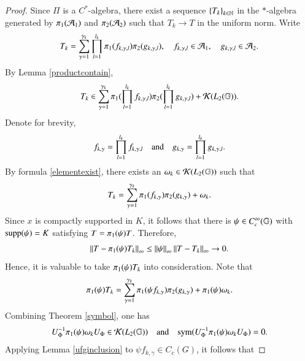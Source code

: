 \documentclass[leqno]{amsart}
\begin{document}
	\begin{proof}
		Since $\Pi$ is a $C^{*}$-algebra, there exist a sequence $\left\{ T_{k} \right\}_{k\in\mathbb{N}}$ in the $*$-algebra generated by $\pi_{1}({\mathcal A}_{1})$ and $\pi_{2}({\mathcal A}_{2})$ such that $T_{k}\rightarrow T$ in the uniform norm.
		Write
		\begin{align*}
			T_{k}=\sum_{\gamma=1}^{\gamma_{k}}\prod_{ l=1}^{ l_{k}}\pi_{1}(f_{k,\gamma, l})\pi_{2}(g_{k,\gamma, l}),
			\quad f_{k,\gamma, l}\in{\mathcal A}_{1},\quad g_{k,\gamma, l}\in{\mathcal A}_{2}.
		\end{align*}
		By  Lemma \ref{productcontain}, 
		\begin{align}\label{elementexist}
			T_{k}\in\sum_{\gamma=1}^{\gamma_{k}}\pi_{1}(\prod_{ l=1}^{ l_{k}}f_{k,\gamma, l})\pi_{2}(\prod_{ l=1}^{ l_{k}}g_{k,\gamma, l})+{\mathcal K}(L_{2}(\mathbb{G})).
		\end{align}
		Denote for brevity,
		\begin{align*}
			f_{k,\gamma}=\prod_{ l=1}^{ l_{k}}f_{k,\gamma, l}\quad{\rm and}\quad g_{k,\gamma}=\prod_{ l=1}^{ l_{k}}g_{k,\gamma, l}.
		\end{align*}
		By formula \eqref{elementexist}, there exists an $\omega_{k}\in{\mathcal K}(L_{2}(\mathbb{G}))$ such that
		\begin{align*}
			T_{k}=\sum_{\gamma=1}^{\gamma_{k}}\pi_{1}(f_{k,\gamma})\pi_{2}(g_{k,\gamma})+\omega_{k}.
		\end{align*}
		Since $x$ is compactly supported in $K$, it follows that there is $\psi\in C_{c}^{\infty}(\mathbb{G})$ with ${\rm supp}(\psi)=K$ satisfying $T=\pi_{1}(\psi)T$.
		Therefore,
		\begin{align*}%
			\Norm{T-\po(\psi)T_{k}}_{\infty}\leq\Norm{\psi}_{\infty}\Norm{T-T_{k}}_{\infty}\rightarrow0.
		\end{align*}
		Hence, it is valuable to take $\pi_{1}(\psi)T_{k}$ into consideration. 
		Note that
		\begin{align}\label{psixk}
			\pi_{1}(\psi)T_{k}=\sum_{\gamma=1}^{\gamma_{k}}\pi_{1}(\psi f_{k,\gamma})\pi_{2}(g_{k,\gamma})+\pi_{1}(\psi)\omega_{k}.
		\end{align}
		Combining Theorem \ref{symbol}, one has
		\begin{align*}%
			U_{\Phi}\rp\po(\psi)\omega_{k}U_{\Phi}\in\K(\lp{2})
			\quad\mbox{and}\quad
			\sym(U_{\Phi}\rp\po(\psi)\omega_{k}U_{\Phi})=0.
		\end{align*}
		Applying  Lemma \ref{ufginclusion} to $\psi f_{k,\gamma}\in C_{c}(G)$, it follows that

\end{proof}
\end{document}
